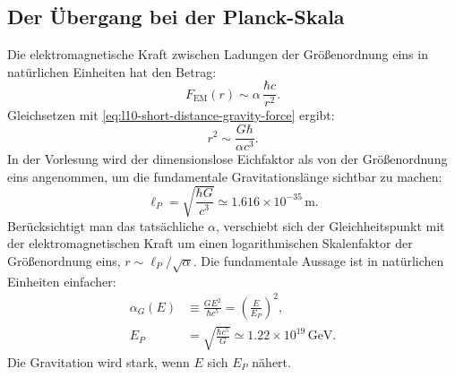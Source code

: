 \begin{classroomqa}
\end{classroomqa}

\begin{classroomqa}
\end{classroomqa}

\subsection{Der Übergang bei der Planck-Skala}

Die elektromagnetische Kraft zwischen Ladungen der Größenordnung eins in natürlichen Einheiten hat den Betrag:
\begin{equation}
  F_{\mathrm{EM}}(r)
  \sim
  \alpha\,\frac{\hbar c}{r^2}.
  \label{eq:l10-em-force-alpha}
\end{equation}
Gleichsetzen mit \eqref{eq:l10-short-distance-gravity-force} ergibt:
\begin{equation}
  r^2\sim\frac{G\hbar}{\alpha c^3}.
  \label{eq:l10-gravity-em-crossing}
\end{equation}
In der Vorlesung wird der dimensionslose Eichfaktor als von der Größenordnung eins angenommen, um die fundamentale Gravitationslänge sichtbar zu machen:
\begin{equation}
  \boxed{\ell_P=\sqrt{\frac{\hbar G}{c^3}}}
  \simeq1.616\times10^{-35}\,\mathrm{m}.
  \label{eq:l10-planck-length}
\end{equation}
Berücksichtigt man das tatsächliche \(\alpha\), verschiebt sich der Gleichheitspunkt mit der elektromagnetischen Kraft um einen logarithmischen Skalenfaktor der Größenordnung eins, \(r\sim\ell_P/\sqrt\alpha\). Die fundamentale Aussage ist in natürlichen Einheiten einfacher:
\begin{equation}
\begin{aligned}
  \alpha_G(E)
  &\equiv\frac{GE^2}{\hbar c^5}
  =\left(\frac{E}{E_P}\right)^2,
  \\
  E_P
  &=\sqrt{\frac{\hbar c^5}{G}}
  \simeq1.22\times10^{19}\,\mathrm{GeV}.
\end{aligned}
  \label{eq:l10-gravitational-coupling}
\end{equation}
Die Gravitation wird stark, wenn \(E\) sich \(E_P\) nähert.

